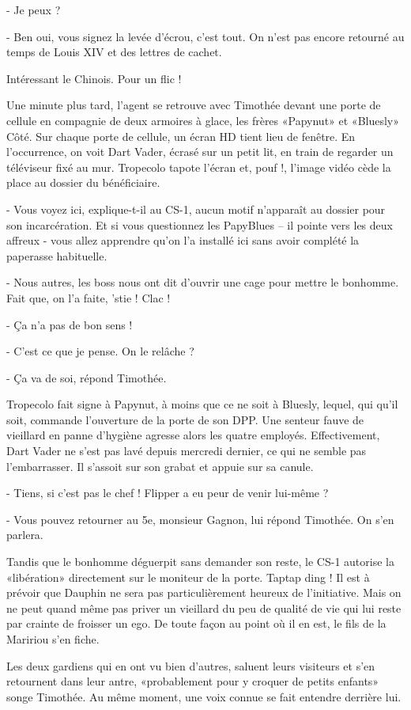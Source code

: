 - Je peux ?

- Ben oui, vous signez la levée d’écrou, c’est tout. On n’est pas encore retourné au temps de Louis XIV et des lettres de cachet.

Intéressant le Chinois. Pour un flic !

Une minute plus tard, l’agent se retrouve avec Timothée devant une porte de cellule en compagnie de deux armoires à glace, les frères «Papynut» et «Bluesly» Côté. Sur chaque porte de cellule, un écran HD tient lieu de fenêtre. En l’occurrence, on voit Dart Vader, écrasé sur un petit lit, en train de regarder un téléviseur fixé au mur. Tropecolo tapote l’écran et, pouf !, l’image vidéo cède la place au dossier du bénéficiaire.

- Vous voyez ici, explique-t-il au CS-1, aucun motif n’apparaît au dossier pour son incarcération. Et si vous questionnez les PapyBlues – il pointe vers les deux affreux - vous allez apprendre qu’on l’a installé ici sans avoir complété la paperasse habituelle.

- Nous autres, les boss nous ont dit d’ouvrir une cage pour mettre le bonhomme. Fait que, on l’a faite, ’stie ! Clac !

- Ça n’a pas de bon sens !

- C’est ce que je pense. On le relâche ?

- Ça va de soi, répond Timothée.

Tropecolo fait signe à Papynut, à moins que ce ne soit à Bluesly, lequel, qui qu’il soit, commande l’ouverture de la porte de son DPP. Une senteur fauve de vieillard en panne d’hygiène agresse alors les quatre employés. Effectivement, Dart Vader ne s’est pas lavé depuis mercredi dernier, ce qui ne semble pas l’embarrasser. Il s’assoit sur son grabat et appuie sur sa canule.

- Tiens, si c’est pas le chef ! Flipper a eu peur de venir lui-même ?

- Vous pouvez retourner au 5e, monsieur Gagnon, lui répond Timothée. On s’en parlera.

Tandis que le bonhomme déguerpit sans demander son reste, le CS-1 autorise la «libération» directement sur le moniteur de la porte. Taptap ding ! Il est à prévoir que Dauphin ne sera pas particulièrement heureux de l’initiative. Mais on ne peut quand même pas priver un vieillard du peu de qualité de vie qui lui reste par crainte de froisser un ego. De toute façon au point où il en est, le fils de la Maririou s’en fiche.

Les deux gardiens qui en ont vu bien d’autres, saluent leurs visiteurs et s’en retournent dans leur antre, «probablement pour y croquer de petits enfants» songe Timothée. Au même moment, une voix connue se fait entendre derrière lui.

